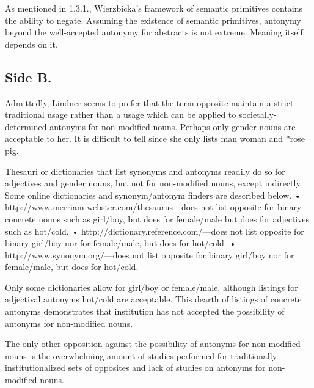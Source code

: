 As mentioned in 1.3.1., Wierzbicka’s framework of semantic primitives contains the ability to negate.  Assuming the existence of semantic primitives, antonymy beyond the well-accepted antonymy for abstracts is not extreme.  Meaning itself depends on it.

\subsection {Side B.} Admittedly, Lindner seems to prefer that the term opposite maintain a strict traditional usage rather than a usage which can be applied to societally-determined antonyms for non-modified nouns.  Perhaps only gender nouns are acceptable to her.  It is difficult to tell since she only lists man \opp woman and *rose \opp pig.  

Thesauri or dictionaries that list synonyms and antonyms readily do so for adjectives and gender nouns, but not for non-modified nouns, except indirectly.  Some online dictionaries and synonym/antonym finders are described below.
	•	http://www.merriam-webster.com/thesaurus—does not list opposite for binary concrete nouns such as girl/boy, but does for female/male but does for adjectives such as hot/cold.
	•	http://dictionary.reference.com/—does not list opposite for binary girl/boy nor for female/male, but does for hot/cold.
	•	http://www.synonym.org/—does not list opposite for binary girl/boy nor for female/male, but does for hot/cold.

Only some dictionaries allow for girl/boy or female/male, although listings for adjectival antonyms hot/cold are acceptable.  This dearth of listings of concrete antonyms demonstrates that institution has not accepted the possibility of antonyms for non-modified nouns. 

The only other opposition against the possibility of antonyms for non-modified nouns is the overwhelming amount of studies performed for traditionally institutionalized sets of opposites and lack of studies on antonyms for non-modified nouns.  